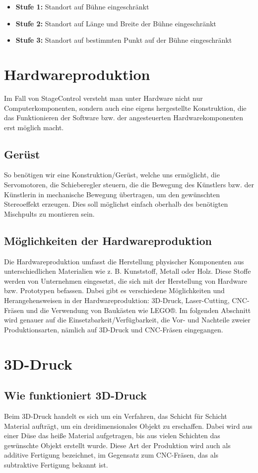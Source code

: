 \begin{itemize}
	\item \textbf{Stufe 1: }Standort auf Bühne eingeschränkt
	\item \textbf{Stufe 2: }Standort auf Länge und Breite der Bühne eingeschränkt
	\item \textbf{Stufe 3: }Standort auf bestimmten Punkt auf der Bühne eingeschränkt
\end{itemize}

\section{Hardwareproduktion }
Im Fall von StageControl versteht man unter Hardware nicht nur Computerkomponenten, sondern auch eine eigens hergestellte Konstruktion, die das Funktionieren der Software bzw. der angesteuerten Hardwarekomponenten erst möglich macht.

\subsection{Gerüst}
 So benötigen wir eine Konstruktion/Gerüst, welche uns ermöglicht, die Servomotoren, die Schieberegler steuern, die die Bewegung des Künstlers bzw. der Künstlerin in mechanische Bewegung übertragen, um den gewünschten Stereoeffekt erzeugen. Dies soll möglichst einfach oberhalb des benötigten Mischpults zu montieren sein.


\subsection{Möglichkeiten der Hardwareproduktion}
Die Hardwareproduktion umfasst die Herstellung physischer Komponenten aus unterschiedlichen Materialien wie z. B. Kunststoff, Metall oder Holz. Diese Stoffe werden von Unternehmen eingesetzt, die sich mit der Herstellung von Hardware bzw. Prototypen befassen. Dabei gibt es verschiedene Möglichkeiten und Herangehensweisen in der Hardwareproduktion: 3D-Druck, Laser-Cutting, CNC-Fräsen und die Verwendung von Baukästen wie LEGO®. Im folgenden Abschnitt wird genauer auf die Einsetzbarkeit/Verfügbarkeit, die Vor- und Nachteile zweier Produktionsarten, nämlich auf 3D-Druck und CNC-Fräsen eingegangen.

\section{3D-Druck}
\subsection{Wie funktioniert 3D-Druck}
Beim 3D-Druck handelt es sich um ein Verfahren, das Schicht für Schicht Material aufträgt, um ein dreidimensionales Objekt zu erschaffen. Dabei wird aus einer Düse das heiße Material aufgetragen, bis aus vielen Schichten das gewünschte Objekt erstellt wurde. Diese Art der Produktion wird auch als additive Fertigung bezeichnet, im Gegensatz zum CNC-Fräsen, das als subtraktive Fertigung bekannt ist.



